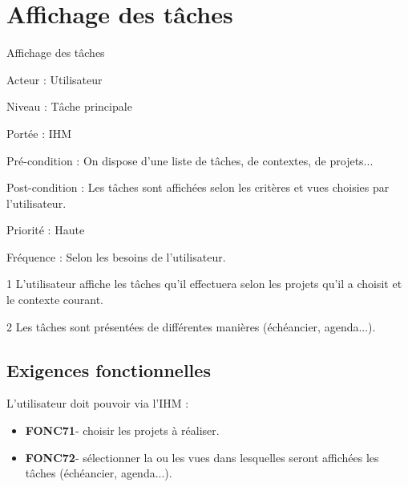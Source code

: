 \section{Affichage des tâches}
	\begin{usecase}{Affichage des tâches} 
		\begin{information}
			\item[Acteur :] Utilisateur
			\item[Niveau :] Tâche principale
			\item[Portée :] IHM
			\item[Pré-condition :] On dispose d'une liste de tâches, de contextes, de projets...
			\item[Post-condition :] Les tâches sont affichées selon les critères et vues choisies par l'utilisateur.
			\item[Priorité :] Haute
			\item[Fréquence :] Selon les besoins de l'utilisateur.
		\end{information}
		\begin{scenario}
			\item[1] L'utilisateur affiche les tâches qu'il effectuera selon les projets qu'il a choisit et le contexte courant.
			\item[2] Les tâches sont présentées de différentes manières (échéancier, agenda...).
		\end{scenario}
	\end{usecase}
	
	\subsection{Exigences fonctionnelles}
		L'utilisateur doit pouvoir via l'IHM :
		\begin{itemize}	\renewcommand{\labelitemi}{}
			\item \textbf{FONC71}- choisir les projets à réaliser.
			\item \textbf{FONC72}- sélectionner la ou les vues dans lesquelles seront affichées les tâches (échéancier, agenda...).
		\end{itemize}
		
